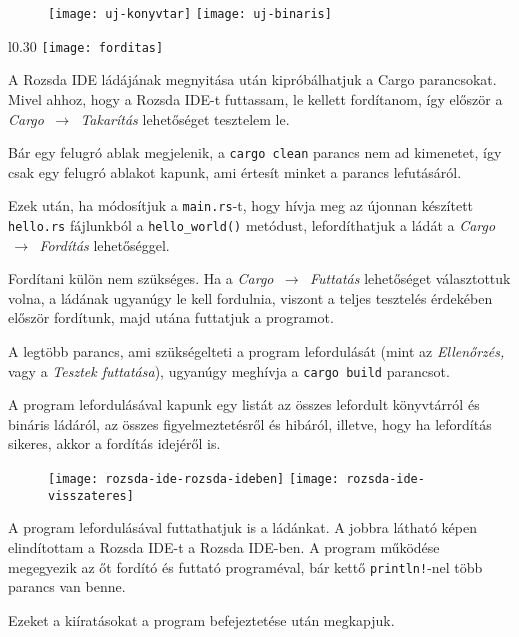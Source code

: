 \begin{figure}[h]
    \centering
    \texttt{[image: uj-konyvtar]}
    \texttt{[image: uj-binaris]}
\end{figure}

\newpage


\begin{wrapfigure}{l}{0.30\textwidth}
    \centering
    \texttt{[image: forditas]}
\end{wrapfigure}

A Rozsda IDE ládájának megnyitása után kipróbálhatjuk a Cargo parancsokat.
Mivel ahhoz, hogy a Rozsda IDE-t futtassam, le kellett fordítanom,
így először a \textit{Cargo $\,\to\,$ Takarítás} lehetőséget tesztelem le.

Bár egy felugró ablak megjelenik, a \texttt{cargo clean} parancs nem ad kimenetet,
így csak egy felugró ablakot kapunk, ami értesít minket a parancs lefutásáról.

Ezek után, ha módosítjuk a \texttt{main.rs}-t, hogy hívja meg az újonnan készített
\texttt{hello.rs} fájlunkból a \texttt{hello\_world()} metódust,
lefordíthatjuk a ládát a \textit{Cargo $\,\to\,$ Fordítás} lehetőséggel.

Fordítani külön nem szükséges.
Ha a \textit{Cargo $\,\to\,$ Futtatás} lehetőséget választottuk volna,
a ládának ugyanúgy le kell fordulnia, viszont a teljes tesztelés érdekében
először fordítunk, majd utána futtatjuk a programot.

A legtöbb parancs, ami szükségelteti a program lefordulását (mint az \textit{Ellenőrzés,}
vagy a \textit{Tesztek futtatása}), ugyanúgy meghívja a \texttt{cargo build} parancsot.

A program lefordulásával kapunk egy listát az összes lefordult könyvtárról és bináris ládáról,
az összes figyelmeztetésről és hibáról, illetve, hogy ha lefordítás sikeres,
akkor a fordítás idejéről is.

\begin{figure}[h]
    \centering
    \texttt{[image: rozsda-ide-rozsda-ideben]}
    \texttt{[image: rozsda-ide-visszateres]}
\end{figure}

A program lefordulásával futtathatjuk is a ládánkat.
A jobbra látható képen elindítottam a Rozsda IDE-t a Rozsda IDE-ben.
A program működése megegyezik az őt fordító és futtató programéval, bár kettő
\texttt{println!}-nel több parancs van benne.

Ezeket a kiíratásokat a program befejeztetése után megkapjuk.
